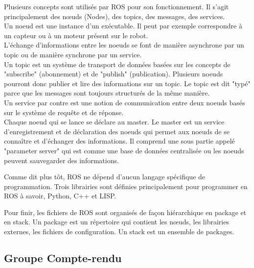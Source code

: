 Plusieurs concepts sont utilisés par ROS pour son fonctionnement. Il s'agit principalement des nœuds (Nodes), des topics, des messages, des services. \\

Un noeud est une instance d'un exécutable. Il peut par exemple correspondre à un capteur ou à un moteur présent sur le robot.\\

L'échange d'informations entre les noeuds se font de manière asynchrone par un topic ou de manière synchrone par un service.\\

Un topic est un système de transport de données basées sur les concepts de "subscribe" (abonnement) et de "publish" (publication).
Plusieurs noeuds pourront donc publier et lire des informations sur un topic. Le topic est dit "typé" parce que les messages sont toujours structurés de la même manière.\\

Un service par contre est une notion de communication entre deux noeuds basés sur le système de requête et de réponse.\\

Chaque noeud qui se lance se déclare au master.
Le master est un service d'enregistrement et de déclaration des noeuds qui permet aux noeuds de se connaître et d'échanger des informations. Il comprend une sous partie appelé "parameter server" qui est comme une base de données centralisée ou les noeuds peuvent sauvegarder des informations.\\



Comme dit plus tôt, ROS ne dépend d’aucun langage spécifique de programmation. Trois librairies sont définies principalement pour programmer en ROS à savoir, Python, C++ et LISP.

Pour finir, les fichiers de ROS sont organisés  de façon hiérarchique en package et en stack. Un package est un répertoire qui contient les nœuds, les librairies externes, les fichiers de configuration. Un stack est un ensemble de packages.


\subsection{Groupe Compte-rendu}

